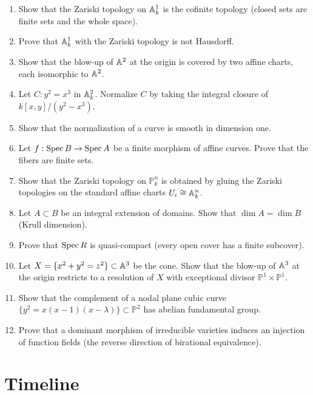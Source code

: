 \begin{enumerate}
    \item [B] Show that the Zariski topology on $\mathbb{A}^1_k$ is the cofinite topology (closed sets are finite sets and the whole space).
    \item [B] Prove that $\mathbb{A}^1_k$ with the Zariski topology is not Hausdorff.
    \item [I] Show that the blow-up of $\mathbb{A}^2$ at the origin is covered by two affine charts, each isomorphic to $\mathbb{A}^2$.
    \item [I] Let $C: y^2 = x^3$ in $\mathbb{A}^2_k$. Normalize $C$ by taking the integral closure of $k[x,y]/(y^2 - x^3)$.
    \item [I] Show that the normalization of a curve is smooth in dimension one.
    \item [I] Let $f: \operatorname{Spec} B \to \operatorname{Spec} A$ be a finite morphism of affine curves. Prove that the fibers are finite sets.
    \item [B] Show that the Zariski topology on $\mathbb{P}^n_k$ is obtained by gluing the Zariski topologies on the standard affine charts $U_i \cong \mathbb{A}^n_k$.
    \item [I] Let $A \subset B$ be an integral extension of domains. Show that $\dim A = \dim B$ (Krull dimension).
    \item [I] Prove that $\operatorname{Spec} R$ is quasi-compact (every open cover has a finite subcover).
    \item [A] Let $X = \{x^2 + y^2 = z^2\} \subset \mathbb{A}^3$ be the cone. Show that the blow-up of $\mathbb{A}^3$ at the origin restricts to a resolution of $X$ with exceptional divisor $\mathbb{P}^1 \times \mathbb{P}^1$.
    \item [A] Show that the complement of a nodal plane cubic curve $\{y^2 = x(x-1)(x-\lambda)\} \subset \mathbb{P}^2$ has abelian fundamental group.
    \item [I] Prove that a dominant morphism of irreducible varieties induces an injection of function fields (the reverse direction of birational equivalence).
\end{enumerate}

\section*{Timeline}

